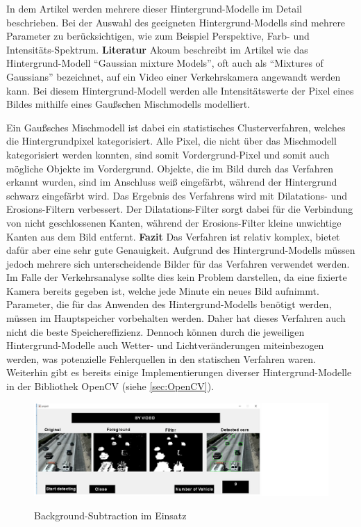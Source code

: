 In dem Artikel \cite{mcivor2000background} werden mehrere dieser Hintergrund-Modelle im Detail beschrieben.
Bei der Auswahl des geeigneten Hintergrund-Modells sind mehrere Parameter zu berücksichtigen, wie zum Beispiel Perspektive, Farb- und Intensitäts-Spektrum.
\newline\newline
\textbf{Literatur}\newline
Akoum beschreibt im Artikel \cite{akoumBSIP} wie das Hintergrund-Modell "`Gaussian mixture Models"', oft auch als "`Mixtures of Gaussians"' bezeichnet, auf ein Video einer Verkehrskamera angewandt werden kann.
Bei diesem Hintergrund-Modell werden alle Intensitätswerte der Pixel eines Bildes mithilfe eines Gaußschen Mischmodells modelliert.

Ein Gaußsches Mischmodell ist dabei ein statistisches Clusterverfahren, welches die Hintergrundpixel kategorisiert.
Alle Pixel, die nicht über das Mischmodell kategorisiert werden konnten, sind somit Vordergrund-Pixel und somit auch mögliche Objekte im Vordergrund.
Objekte, die im Bild durch das Verfahren erkannt wurden, sind im Anschluss weiß eingefärbt, während der Hintergrund schwarz eingefärbt wird.
Das Ergebnis des Verfahrens wird mit Dilatations- und Erosions-Filtern verbessert. 
Der Dilatations-Filter sorgt dabei für die Verbindung von nicht geschlossenen Kanten, während der Erosions-Filter kleine unwichtige Kanten aus dem Bild entfernt.
\newline\newline
\textbf{Fazit}\newline
Das Verfahren ist relativ komplex, bietet dafür aber eine sehr gute Genauigkeit. 
Aufgrund des Hintergrund-Modells müssen jedoch mehrere sich unterscheidende Bilder für das Verfahren verwendet werden.
Im Falle der Verkehrsanalyse sollte dies kein Problem darstellen, da eine fixierte Kamera bereits gegeben ist, welche jede Minute ein neues Bild aufnimmt.
Parameter, die für das Anwenden des Hintergrund-Modells benötigt werden, müssen im Hauptspeicher vorbehalten werden.
Daher hat dieses Verfahren auch nicht die beste Speichereffizienz.
Dennoch können durch die jeweiligen Hintergrund-Modelle auch Wetter- und Lichtveränderungen miteinbezogen werden, was potenzielle Fehlerquellen in den statischen Verfahren waren.
Weiterhin gibt es bereits einige Implementierungen diverser Hintergrund-Modelle in der Bibliothek OpenCV (siehe \ref{sec:OpenCV}).
\begin{figure}[!ht]
   \centering
     \includegraphics[width=15cm]{Bilder/mogpaper} \\
 \caption{Background-Subtraction im Einsatz}
 \label{fig:BSSoftware}
\end{figure}
\newpage

